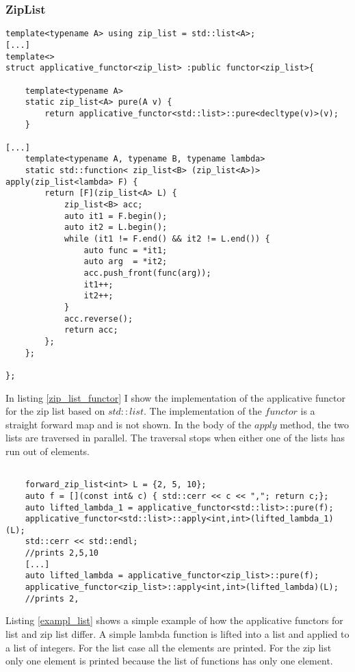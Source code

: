 \documentclass[12pt,fleqn]{article}
\begin{document}
\subsubsection{ZipList}
%   
\begin{lstlisting}[caption=ziplist is an applicative functor, label=zip_list_functor]
template<typename A> using zip_list = std::list<A>;
[...]
template<> 
struct applicative_functor<zip_list> :public functor<zip_list>{

    template<typename A>
    static zip_list<A> pure(A v) {
		return applicative_functor<std::list>::pure<decltype(v)>(v);
    }

[...]
    template<typename A, typename B, typename lambda>
    static std::function< zip_list<B> (zip_list<A>)> apply(zip_list<lambda> F) {
		return [F](zip_list<A> L) {
			zip_list<B> acc;
			auto it1 = F.begin();
			auto it2 = L.begin();
			while (it1 != F.end() && it2 != L.end()) {
				auto func = *it1;
				auto arg  = *it2;
				acc.push_front(func(arg));
				it1++;
				it2++;
			}
			acc.reverse();
			return acc;
		};
	};
	
};
\end{lstlisting}

In listing \ref{zip_list_functor} I show the implementation of the applicative functor for the zip list based on $std::list$. 
The implementation of the $functor$ is  a straight forward map and is not shown. 
In the body of the $apply$ method, the two lists are traversed in parallel. The traversal stops when either one of the lists has run out of elements.
\begin{lstlisting}[caption=the applicative functor for list and ziplist, label=exampl_list]

	forward_zip_list<int> L = {2, 5, 10};
	auto f = [](const int& c) { std::cerr << c << ","; return c;};
	auto lifted_lambda_1 = applicative_functor<std::list>::pure(f);
	applicative_functor<std::list>::apply<int,int>(lifted_lambda_1)(L);
	std::cerr << std::endl;
    //prints 2,5,10
    [...]
	auto lifted_lambda = applicative_functor<zip_list>::pure(f);
	applicative_functor<zip_list>::apply<int,int>(lifted_lambda)(L);
    //prints 2,
\end{lstlisting}

Listing \ref{exampl_list} shows a simple example of how the applicative functors for list and zip list differ. 
A simple lambda function is lifted into a list and applied to a list of integers. 
For the list case all the elements are printed. For the zip list only one element is printed because the list of functions has only one element.
   
\end{document}
